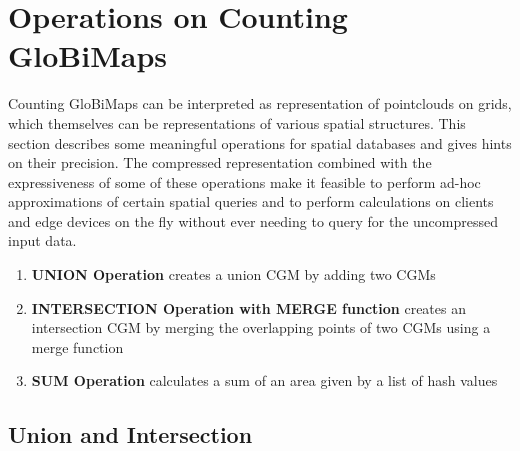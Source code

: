 \documentclass[sigconf, nonacm]{acmart}
\begin{document}
%
%

\section{Operations on Counting GloBiMaps}\label{operations-on-counting-globimaps}

Counting GloBiMaps can be interpreted as representation of pointclouds on grids, which themselves can be representations of various spatial structures. This section describes some meaningful operations for spatial databases and gives hints on their precision.
The compressed representation combined with the expressiveness of some
of these operations make it feasible to perform ad-hoc approximations of
certain spatial queries and to perform calculations on clients and edge
devices on the fly without ever needing to query for the uncompressed input data.

\begin{enumerate}
  \item{\textbf{UNION Operation} creates a union CGM by adding two CGMs}
  \item{\textbf{INTERSECTION Operation with MERGE function} creates an intersection CGM by merging the overlapping points of two CGMs using a merge function}
  \item{\textbf{SUM Operation} calculates a sum of an area given by a list of hash values}
\end{enumerate}

\subsection{Union and Intersection}\label{union-and-intersection}
\end{document}
